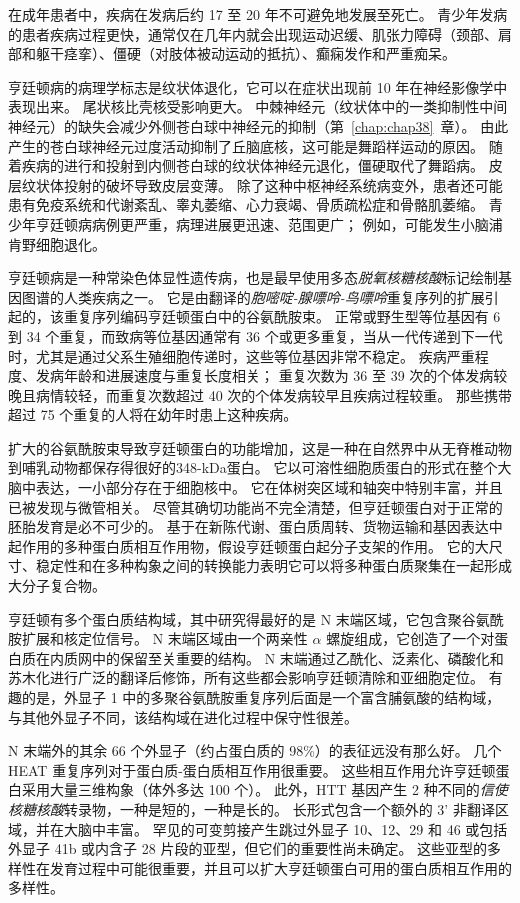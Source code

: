 在成年患者中，疾病在发病后约 17 至 20 年不可避免地发展至死亡。
青少年发病的患者疾病过程更快，通常仅在几年内就会出现运动迟缓、肌张力障碍（颈部、肩部和躯干痉挛）、僵硬（对肢体被动运动的抵抗）、癫痫发作和严重痴呆。


亨廷顿病的病理学标志是纹状体退化，它可以在症状出现前 10 年在神经影像学中表现出来。
尾状核比壳核受影响更大。
中棘神经元（纹状体中的一类抑制性中间神经元）的缺失会减少外侧苍白球中神经元的抑制（第~\ref{chap:chap38}~章）。
由此产生的苍白球神经元过度活动抑制了丘脑底核，这可能是舞蹈样运动的原因。
随着疾病的进行和投射到内侧苍白球的纹状体神经元退化，僵硬取代了舞蹈病。
皮层纹状体投射的破坏导致皮层变薄。
除了这种中枢神经系统病变外，患者还可能患有免疫系统和代谢紊乱、睾丸萎缩、心力衰竭、骨质疏松症和骨骼肌萎缩。
青少年亨廷顿病病例更严重，病理进展更迅速、范围更广；
例如，可能发生小脑浦肯野细胞退化。


亨廷顿病是一种常染色体显性遗传病，也是最早使用多态\textit{脱氧核糖核酸}标记绘制基因图谱的人类疾病之一。
它是由翻译的\textit{胞嘧啶-腺嘌呤-鸟嘌呤}重复序列的扩展引起的，该重复序列编码亨廷顿蛋白中的谷氨酰胺束。
正常或野生型等位基因有 6 到 34 个重复，而致病等位基因通常有 36 个或更多重复，当从一代传递到下一代时，尤其是通过父系生殖细胞传递时，这些等位基因非常不稳定。
疾病严重程度、发病年龄和进展速度与重复长度相关；
重复次数为 36 至 39 次的个体发病较晚且病情较轻，而重复次数超过 40 次的个体发病较早且疾病过程较重。
那些携带超过 75 个重复的人将在幼年时患上这种疾病。


扩大的谷氨酰胺束导致亨廷顿蛋白的功能增加，这是一种在自然界中从无脊椎动物到哺乳动物都保存得很好的348-kDa蛋白。
它以可溶性细胞质蛋白的形式在整个大脑中表达，一小部分存在于细胞核中。
它在体树突区域和轴突中特别丰富，并且已被发现与微管相关。
尽管其确切功能尚不完全清楚，但亨廷顿蛋白对于正常的胚胎发育是必不可少的。
基于在新陈代谢、蛋白质周转、货物运输和基因表达中起作用的多种蛋白质相互作用物，假设亨廷顿蛋白起分子支架的作用。
它的大尺寸、稳定性和在多种构象之间的转换能力表明它可以将多种蛋白质聚集在一起形成大分子复合物。


亨廷顿有多个蛋白质结构域，其中研究得最好的是 N 末端区域，它包含聚谷氨酰胺扩展和核定位信号。
N 末端区域由一个两亲性 $\alpha$ 螺旋组成，它创造了一个对蛋白质在内质网中的保留至关重要的结构。
N 末端通过乙酰化、泛素化、磷酸化和苏木化进行广泛的翻译后修饰，所有这些都会影响亨廷顿清除和亚细胞定位。
有趣的是，外显子 1 中的多聚谷氨酰胺重复序列后面是一个富含脯氨酸的结构域，与其他外显子不同，该结构域在进化过程中保守性很差。


N 末端外的其余 66 个外显子（约占蛋白质的 98\%）的表征远没有那么好。
几个 HEAT 重复序列对于蛋白质-蛋白质相互作用很重要。
这些相互作用允许亨廷顿蛋白采用大量三维构象（体外多达 100 个）。
此外，HTT 基因产生 2 种不同的\textit{信使核糖核酸}转录物，一种是短的，一种是长的。
长形式包含一个额外的 3' 非翻译区域，并在大脑中丰富。
罕见的可变剪接产生跳过外显子 10、12、29 和 46 或包括外显子 41b 或内含子 28 片段的亚型，但它们的重要性尚未确定。
这些亚型的多样性在发育过程中可能很重要，并且可以扩大亨廷顿蛋白可用的蛋白质相互作用的多样性。



